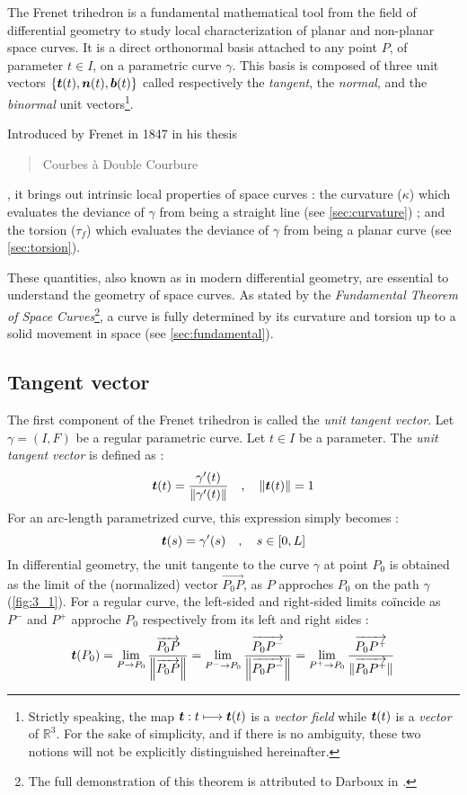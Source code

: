 The Frenet trihedron is a fundamental mathematical tool from the field of differential geometry to study local characterization of planar and non-planar space curves. It is a direct orthonormal basis attached to any point $P$, of parameter $t \in I$, on a parametric curve $\gamma$. This basis is composed of three unit vectors $\{\boldsymbol{t}(t),\boldsymbol{n}(t),\boldsymbol{b}(t)\}$ called respectively the \emph{tangent}, the \emph{normal}, and the \emph{binormal} unit vectors\footnote{
Strictly speaking, the map $\boldsymbol{t} : t \longmapsto \boldsymbol{t}(t)$ is a \emph{vector field} while $\boldsymbol{t}(t)$ is a \emph{vector} of $\mathbb{R}^3$. For the sake of simplicity, and if there is no ambiguity, these two notions will not be explicitly distinguished hereinafter.
}.

Introduced by Frenet in 1847 in his thesis \blockcquote[]{Frenet1852}{Courbes à Double Courbure}, it brings out intrinsic local properties of space curves : the curvature ($\kappa$) which evaluates the deviance of $\gamma$ from being a straight line (see \cref{sec:curvature}) ; and the torsion ($\tau_f$) which evaluates the deviance of $\gamma$ from being a planar curve (see \cref{sec:torsion}).

These quantities, also known as  in modern differential geometry, are essential to understand the geometry of space curves. As stated by the \emph{Fundamental Theorem of Space Curves}\footnote{The full demonstration of this theorem is attributed to Darboux in \cite[p.11]{Delcourt2007}.}, a curve is fully determined by its curvature and torsion up to a solid movement in space (see \cref{sec:fundamental}).

\subsection{Tangent vector}
The first component of the Frenet trihedron is called the \emph{unit tangent vector}. 
Let $\gamma = (I,F)$ be a regular parametric curve. Let $t \in I$ be a parameter. The \emph{unit tangent vector} is defined as :
\begin{equation}
	\boldsymbol{t}(t) = \frac{\gamma'(t)}{\|\gamma'(t)\|}
	\quad,\quad
	\|\boldsymbol{t}(t)\|=1
\end{equation}
For an arc-length parametrized curve, this expression simply becomes :
\begin{equation}
	\boldsymbol{t}(s) = \gamma'(s)
	\quad,\quad
	s \in [0,L]
\end{equation}
In differential geometry, the unit tangente to the curve $\gamma$ at point $P_0$ is obtained as the limit of the (normalized) vector $\overrightarrow{P_0 P}$, as $P$ approches $P_0$ on the path $\gamma$ (\cref{fig:3_1}). For a regular curve, the left-sided and right-sided limits coïncide as $P^-$ and $P^+$ approche $P_0$ respectively from its left and right sides :
\begin{equation}
	\boldsymbol{t}(P_0)
	= \lim_{P \to P_0}\frac{\overrightarrow{P_0 P}}{\left\|\overrightarrow{P_0 P}\right\|}
	= \lim_{P^- \to P_0}\frac{\overrightarrow{P_0 P^-}}{\left\|\overrightarrow{P_0 P^-}\right\|}
	= \lim_{P^+ \to P_0}\frac{\overrightarrow{P_0 P^+}}{\|\overrightarrow{P_0 P^+}\|}
\label{eq:3_4}
\end{equation}

